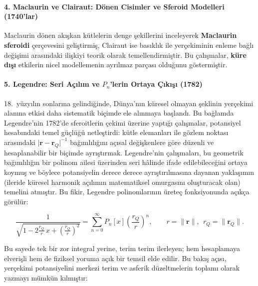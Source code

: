 \paragraph{4. Maclaurin ve Clairaut: Dönen Cisimler ve Sferoid Modelleri (1740'lar)} Maclaurin dönen akışkan kütlelerin denge şekillerini inceleyerek \textbf{Maclaurin sferoidi} çerçevesini geliştirmiş, Clairaut ise basıklık ile yerçekiminin enleme bağlı değişimi arasındaki ilişkiyi teorik olarak temellendirmiştir.
Bu çalışmalar, \textbf{küre dışı} etkilerin nicel modellemenin ayrılmaz parçası olduğunu göstermiştir.


\paragraph{5. Legendre: Seri Açılım ve $P_n$’lerin Ortaya Çıkışı (1782)}
18.\ yüzyılın sonlarına gelindiğinde, Dünya’nın küresel olmayan şeklinin yerçekimi alanına etkisi daha sistematik
biçimde ele alınmaya başlandı. Bu bağlamda Legendre’nin 1782’de sferoitlerin çekimi üzerine yaptığı çalışmalar,
potansiyel hesabındaki temel güçlüğü netleştirdi: kütle elemanları ile gözlem noktası arasındaki
\(\lvert \mathbf{r}-\mathbf{r}_Q\rvert^{-1}\) bağımlılığını açısal değişkenlere göre düzenli ve hesaplanabilir bir biçimde ayrıştırmak.
Legendre’nin çalışmaları, bu geometrik bağımlılığın bir polinom ailesi üzerinden seri hâlinde ifade edilebileceğini ortaya koymuş
ve böylece potansiyelin derece derece ayrıştırılmasına dayanan yaklaşımın
(ileride küresel harmonik açılımın matematiksel omurgasını oluşturacak olan)
temelini atmıştır. Bu fikir, Legendre polinomlarının üreteç fonksiyonunda açıkça görülür:

\begin{equation}
\frac{1}{\sqrt{1-2\frac{r_Q}{r}\,x+\left(\frac{r_Q}{r}\right)^2}}
=
\sum_{n=0}^{\infty}P_n[x]\left(\frac{r_Q}{r}\right)^n,
\qquad r=\lVert\mathbf{r}\rVert,\ \ r_Q=\lVert\mathbf{r}_Q\rVert.
\label{eq:legendre_generating_function}
\end{equation}





Bu sayede tek bir zor integral yerine, terim terim ilerleyen; hem hesaplamaya elverişli hem de fiziksel yoruma açık bir temsil elde edilir. Bu bakış açısı, yerçekimi potansiyelini merkezi terim ve asferik düzeltmelerin toplamı olarak yazmayı mümkün kılmıştır:

